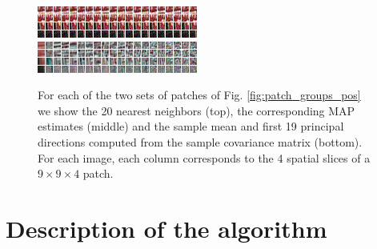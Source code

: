 \documentclass[10pt, journal, twocolumn, final, a4paper]{IEEEtran}
\begin{document}
\begin{figure}[htpb!]
	\includegraphics[width = \columnwidth]{figs/patch_groups/patch_group_bus_255_056_010_s40_wx37_wt2_sx9_st4_r040_n200_deno.png}\\
	\vspace{.2cm}
	\includegraphics[width = \columnwidth]{figs/patch_groups/patch_group_bus_255_056_010_s40_wx37_wt2_sx9_st4_r040_n200_pcas.png}\\
	\vspace{.2cm}
	\caption{For each of the two sets of patches of Fig. \ref{fig:patch_groups_pos} we show
	the 20 nearest neighbors (top), the corresponding MAP estimates (middle) and the sample mean 
	and first 19 principal directions computed from the sample covariance matrix (bottom).
	For each image, each column corresponds to the 4 spatial slices of a $9\times9\times4$ patch.}
	\label{fig:patch_groups_patches}
\end{figure}

\section{Description of the algorithm}
\label{sec:algorithm}
\end{document}
